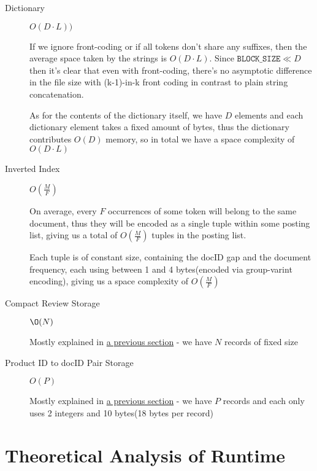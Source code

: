 \documentclass[11pt]{article}
\begin{document}
\begin{description}	
	\item[Dictionary] $O(D \cdot L))$ 
	
	If we ignore front-coding or if all tokens don't share any suffixes, then the average space taken by
	the strings is $O(D \cdot L)$. Since $\texttt{BLOCK\_SIZE} \ll D$ then it's clear that even with front-coding,
	there's no asymptotic difference in the file size with (k-1)-in-k front coding in contrast to plain string concatenation.
	
	As for the contents of the dictionary itself, we have $D$ elements and each dictionary element takes a fixed amount of bytes,
	thus the dictionary contributes $O(D)$ memory, so in total we have a space complexity of $O(D \cdot L)$
	

	\item[Inverted Index] $O(\frac{M}{F})$
	
	On average, every $F$ occurrences of some token will belong to the same document, thus
	they will be encoded as a single tuple within some posting list, giving us a total of
	 $O(\frac{M}{F})$ tuples in the posting list.
	 
	 Each tuple is of constant size, containing the docID gap and the document frequency,
	 each using between 1 and 4 bytes(encoded via group-varint encoding), giving us a space complexity of $O(\frac{M}{F})$
	 
	 
	\item[Compact Review Storage] $\O(N)$
	 
	Mostly explained in \hyperref[sec:compactStorage]{a previous section} - we have $N$ records of fixed size
	 
	\item[Product ID to docID Pair Storage] $O(P)$ 
	 
	 Mostly explained in \hyperref[sec:pairStorage]{a previous section} - we have $P$ records and each only uses 2 integers and 10 bytes(18 bytes per record)
	 
\end{description}
  
\section{Theoretical Analysis of Runtime}  

\begin{comment}
{\em Using the same variables, theoretically analyze the runtime of the functions of IndexReader. Include both the runtime and a short explanation.}
\end{comment}
\end{document}
